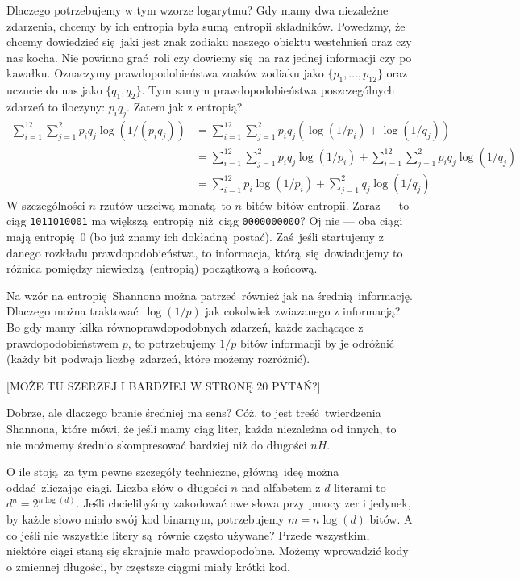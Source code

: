 \documentclass[10pt,a4paper]{article}
\begin{document}
Dlaczego potrzebujemy w tym wzorze logarytmu? 
Gdy mamy dwa niezależne zdarzenia, chcemy by ich entropia była sumą entropii składników.
%
%
Powedzmy, że chcemy dowiedzieć się jaki jest znak zodiaku naszego obiektu westchnień oraz czy nas kocha.
Nie powinno grać roli czy dowiemy się na raz jednej informacji czy po kawałku.
Oznaczymy prawdopodobieństwa znaków zodiaku jako $\{p_1, \ldots, p_{12} \}$ oraz uczucie do nas jako $\{q_1, q_2\}$.
Tym samym prawdopodobieństwa poszczególnych zdarzeń to iloczyny: $p_i q_j$.
Zatem jak z entropią?
%
\begin{align}
    \sum_{i=1}^{12} \sum_{j=1}^2 p_i q_j \log(1/(p_i q_j))
    &= \sum_{i=1}^{12} \sum_{j=1}^2 p_i q_j \left( \log(1/p_i) + \log(1/q_j) \right)\\
    &= \sum_{i=1}^{12} \sum_{j=1}^2 p_i q_j \log(1/p_i)
    +\sum_{i=1}^{12} \sum_{j=1}^2 p_i q_j \log(1/q_j)\\
    &= \sum_{i=1}^{12} p_i \log(1/p_i)
    + \sum_{j=1}^2 q_j \log(1/q_j)
\end{align}
%
W szczególności $n$ rzutów uczciwą monatą to $n$ bitów bitów entropii.
Zaraz --- to ciąg \texttt{1011010001} ma większą entropię niż ciąg \texttt{0000000000}? 
Oj nie --- oba ciągi mają entropię $0$ (bo już znamy ich dokładną postać).
Zaś jeśli startujemy z danego rozkładu prawdopodobieństwa, to informacja, którą się dowiadujemy to różnica pomiędzy niewiedzą (entropią) początkową a końcową.

Na wzór na entropię Shannona można patrzeć również jak na średnią informację.
Dlaczego można traktować $\log(1/p)$ jak cokolwiek zwiazanego z informacją?
Bo gdy mamy kilka równoprawdopodobnych zdarzeń, każde zachącące z prawdopodobieństwem $p$,
to potrzebujemy $1/p$ bitów informacji by je odróżnić (każdy bit podwaja liczbę zdarzeń, które możemy rozróżnić).

[MOŻE TU SZERZEJ I BARDZIEJ W STRONĘ 20 PYTAŃ?]

Dobrze, ale dlaczego branie średniej ma sens?
Cóż, to jest treść twierdzenia Shannona, które mówi, że jeśli mamy ciąg liter,
każda niezależna od innych, to nie możmemy średnio skompresować bardziej niż do długości $n H$.

O ile stoją za tym pewne szczegóły techniczne, główną ideę można oddać zliczając ciągi.
Liczba słów o długości $n$ nad alfabetem z $d$ literami to $d^n=2^{n \log(d)}$.
Jeśli chcielibyśmy zakodować owe słowa przy pmocy zer i jedynek,
by każde słowo miało swój kod binarnym, potrzebujemy $m = n \log(d)$ bitów.
A co jeśli nie wszystkie litery są równie często używane?
Przede wszystkim, niektóre ciągi staną się skrajnie mało prawdopodobne.
Możemy wprowadzić kody o zmiennej długości, by częstsze ciągmi miały krótki kod.
\end{document}
